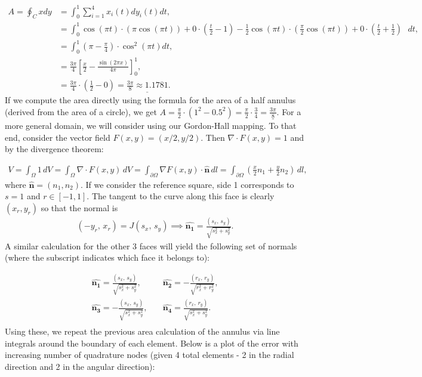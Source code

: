\documentclass{article}
\begin{document}
  \begin{align*}
    A = \oint_{C}xdy & = \int_{0}^{1}\sum_{i=1}^{4}x_i(t)dy_i(t)dt, \\
    & = \int_{0}^{1}\cos(\pi t)\cdot(\pi \cos(\pi t))+0\cdot(\frac{t}{2}-1)-\frac{1}{2}\cos(\pi t)\cdot(\frac{\pi}{2} \cos(\pi t))+0\cdot(\frac{t}{2}+\frac{1}{2})\mbox{ }dt, \\
    & =\int_{0}^{1}(\pi-\frac{\pi}{4})\cdot \cos^2(\pi t)dt,\\ 
    & =\frac{3\pi}{4}\left[\frac{x}{2}-\frac{\sin(2\pi x)}{4\pi}\right]_0^1 ,\\
    & =\frac{3\pi}{4}\cdot(\frac{1}{2}-0)=\underline{\frac{3\pi}{8}\approx1.1781}.  
  \end{align*}
\noindent If we compute the area directly using the formula for the area of a half annulus (derived from the area of a circle), we get $A=\frac{\pi}{2}\cdot(1^2-0.5^2)=\frac{\pi}{2}\cdot\frac{3}{4}=\underline{\frac{3\pi}{8}}$. For a more general domain, we will consider using our Gordon-Hall mapping. To that end, consider the vector field $F(x,y) = (x/2, y/2)$. Then $\nabla \cdot F(x,y) = 1$ and by the divergence theorem:

  \begin{align*}
    V =  \int_\Omega 1 \, dV = \int_\Omega \nabla \cdot F(x,y) \, dV = \int_{\partial \Omega} \nabla F(x,y) \cdot \hat{\textbf{n}} \, dl = \int_{\partial \Omega} \left( \frac{x}{2}n_1 + \frac{y}{2}n_2 \right)\, dl,
  \end{align*}
where $\hat{\textbf{n}} = (n_1,n_2)$. If we consider the reference square, side 1 corresponds to $s = 1$ and $r \in [-1,1]$. The tangent to the curve along this face is clearly $(x_r,y_r)$ so that the normal is
  \begin{align*}
    (-y_r, \, x_r) = J (s_x, \, s_y) \implies \hat{\boldsymbol{n_1}} = \frac{(s_x, \, s_y)}{\sqrt{s_x^2 + s_y^2}}.
  \end{align*}
A similar calculation for the other 3 faces will yield the following set of normals (where the subscript indicates which face it belongs to):

  \begin{align*}
    \hat{\boldsymbol{n_1}} = \frac{(s_x, \, s_y)}{\sqrt{s_x^2 + s_y^2}}, & \quad
    \hat{\boldsymbol{n_2}} = -\frac{(r_x, \, r_y)}{\sqrt{r_x^2 + r_y^2}}, \\
    \hat{\boldsymbol{n_3}} = -\frac{(s_x, \, s_y)}{\sqrt{s_x^2 + s_y^2}}, & \quad
    \hat{\boldsymbol{n_4}} = \frac{(r_x, \, r_y)}{\sqrt{s_x^2 + s_y^2}}. \\
  \end{align*}
Using these, we repeat the previous area calculation of the annulus via line integrals around the boundary of each element. Below is a plot of the error with increasing number of quadrature nodes (given 4 total elements - 2 in the radial direction and 2 in the angular direction):
\end{document}
